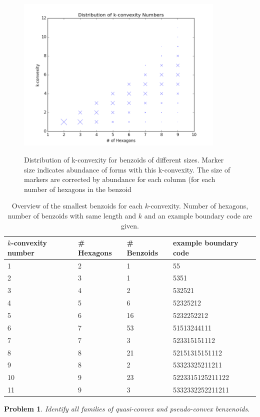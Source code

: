 \documentclass[a4paper,10pt]{article}
\newcounter{theorem}
\newtheorem{problem}{Problem}[section]
\begin{document}
{\begin{figure}
\centering
 \includegraphics[width=100mm]{figures/distribution_of_k_values}
 \label{fig_k}
 \caption{Distribution of k-convexity for benzoids of different sizes. Marker size indicates abundance of forms with this k-convexity. The size of markers are corrected by abundance for each column (for each number of hexagons in the benzoid}
\end{figure}

\begin{table}
 \caption{Overview of the smallest benzoids for each $k$-convexity. Number of hexagons, number of benzoids with same length and $k$ and an example boundary code are given.}
 \medskip
 \begin{tabular}{|l l l l|}
 \hline
  $k$-convexity number & \# Hexagons & \# Benzoids & example boundary code \\
  \hline
  1 & 2 & 1 & 55 \\
  2 & 3 & 1 & 5351 \\
  3 & 4 & 2 & 532521 \\
  4 & 5 & 6 & 52325212\\
  5 & 6 & 16 & 5232252212\\
  6 & 7 & 53 & 51513244111\\
  7 & 7 & 3 & 523315151112\\
  8 & 8 & 21 & 52151315151112\\
  9 & 8 & 2 & 53323325211211\\
  10 & 9 & 23 & 5223315125211122\\
  11 & 9 & 3 & 5332332252211211\\
  \hline
 \end{tabular}
\end{table}
\begin{problem}
Identify all families of quasi-convex and pseudo-convex benzenoids.
\end{problem}


}
\end{document}

